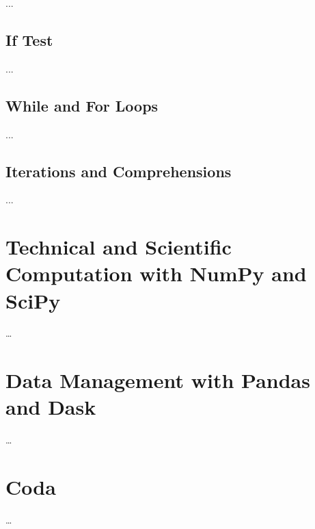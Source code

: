 \documentclass[a4paper,11pt]{book}
\begin{document}
...

\section{If Test}

...

\section{While and For Loops}

...

\section{Iterations and Comprehensions}

...


\theendnotes

\chapter{Technical and Scientific Computation with NumPy and SciPy}

\ldots

\chapter{Data Management with Pandas and Dask}

\ldots

\chapter{Coda}
\ldots
\end{document}
